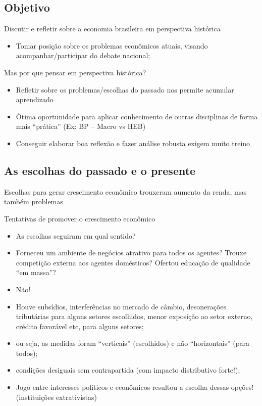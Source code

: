 \documentclass[a4paper,12pt]{article}[abntex2]
\begin{document}
\subsection{\textbf{Objetivo}}
Discutir e refletir sobre a economia brasileira em perspectiva histórica\begin{itemize}
    \item Tomar posição sobre os problemas econômicos atuais, visando acompanhar/participar do debate nacional;
\end{itemize}

Mas por que pensar em perspectiva histórica?\begin{itemize}
    \item Refletir sobre os problemas/escolhas do passado nos permite acumular aprendizado
    \item Ótima oportunidade para aplicar conhecimento de outras disciplinas de forma mais “prática” (Ex: BP – Macro vs HEB)
    \item Conseguir elaborar boa reflexão e fazer análise robusta exigem muito treino
\end{itemize}

\subsection{\textbf{As escolhas do passado e o presente}}
Escolhas para gerar crescimento econômico trouxeram aumento da renda, mas também problemas

Tentativas de promover o crescimento econômico\begin{itemize}
    \item As escolhas seguiram em qual sentido?
    \item Forneceu um ambiente de negócios atrativo para todos os agentes? Trouxe competição externa aos agentes domésticos? Ofertou educação de qualidade “em massa”?
    \item Não! 
    \item Houve subsídios, interferências no mercado de câmbio, desonerações tributárias para alguns setores escolhidos, menor exposição ao setor externo, crédito favorável etc, para alguns setores; 
    \item ou seja, as medidas foram “verticais” (escolhidos) e não “horizontais” (para todos);
    \item condições desiguais sem contrapartida (com impacto distributivo forte!);
    \item Jogo entre interesses políticos e econômicos resultou a escolha dessas opções! (instituições extrativistas)
\end{itemize}
\end{document}
